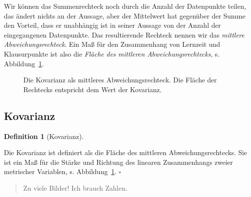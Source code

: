 \documentclass[
  letterpaper,
  twoside,
  open=any]{scrbook}
\theoremstyle{definition}
\newtheorem{definition}{Definition}[chapter]
\theoremstyle{definition}
\theoremstyle{definition}
\theoremstyle{remark}
\begin{document}
Wir können das Summenrechteck noch durch die Anzahl der Datenpunkte
teilen, das ändert nichts an der Aussage, aber der Mittelwert hat
gegenüber der Summe den Vorteil, dass er unabhängig ist in seiner
Aussage von der Anzahl der eingegangenen Datenpunkte. Das resultierende
Rechteck nennen wir das \emph{mittlere Abweichungsrechteck}. Ein Maß für
den Zusammenhang von Lernzeit und Klausurpunkte ist also die
\emph{Fläche des mittleren Abweichungsrechtecks}, s.
Abbildung~\ref{fig-cov2}.

\begin{figure}


\caption{\label{fig-cov2}Die Kovarianz als mittleres
Abweichungsrechteck. Die Fläche der Rechtecks entspricht dem Wert der
Kovarianz.}

\end{figure}%

\subsection{Kovarianz}\label{sec-kov}

\begin{definition}[Kovarianz]\protect\hypertarget{def-kov}{}\label{def-kov}

Die Kovarianz ist definiert als die Fläche des mittleren
Abweichungsrechtecks. Sie ist ein Maß für die Stärke und Richtung des
linearen Zusammenhangs zweier metrischer Variablen, s.
Abbildung~\ref{fig-cov2}. \(\square\)

\end{definition}

\begin{quote}
{} Zu viele Bilder! Ich brauch Zahlen.
\end{quote}
\end{document}
